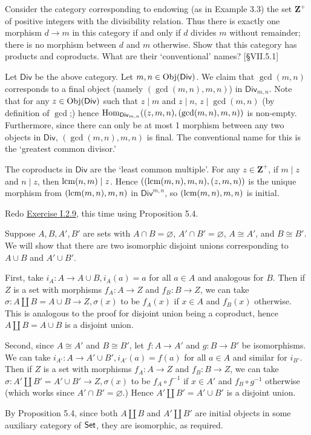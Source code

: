 \begin{problem}[5.6]
	Consider the category corresponding to endowing (as in Example 3.3) the set
	$\mathbf{Z}^+$ of positive integers with the divisibility relation. Thus there
	is exactly one morphism $d\to m$ in this category if and only if $d$ divides $m$
	without remainder; there is no morphism between $d$ and $m$ otherwise. Show that
	this category has products and coproducts. What are their `conventional' names?
	[\S VII.5.1]
\end{problem}
\begin{solution}
	Let $\mathsf{Div}$ be the above category. Let $m,n\in\mathrm{Obj}(\mathsf{Div})$. We claim that $\gcd(m,n)$ corresponds to a final object (namely $(\gcd(m,n),m,n)$) in $\mathsf{Div}_{m,n}$. Note that for any $z\in\mathrm{Obj}(\mathsf{Div})$ such that $z\mid m$ and $z\mid
	n$, $z\mid\gcd(m,n)$ (by definition of $\gcd$;) hence $\mathrm{Hom}_{\mathsf{Div}_{m,n}}((z,m,n),(\gcd(m,n),m,n))$ is non-empty. Furthermore, since there can only be at most 1 morphism between any two objects in $\mathsf{Div}$, $(\gcd(m,n),m,n)$ is final. The conventional name for this is the `greatest common divisor.'
	
	The coproducts in $\mathsf{Div}$ are the `least common multiple'. For any
	$z\in\mathbf{Z}^+$, if $m\mid z$ and $n\mid z$, then $\operatorname{lcm}(n,m)\mid z$. Hence $((\operatorname{lcm}(m,n),m,n),(z,m,n))$ is the unique morphism from $(\operatorname{lcm}(m,n),m,n)$ in $\mathsf{Div}^{m,n}$, so $(\operatorname{lcm}(m,n),m,n)$ is initial.
\end{solution}


\begin{problem}[5.7]
	Redo \hyperlink{Exercise I.2.9}{Exercise I.2.9}, this time using Proposition 5.4.
\end{problem}
\begin{solution}
	Suppose $A,B,A',B'$ are sets with $A\cap B=\varnothing$, $A'\cap B'=\varnothing$,
	$A\cong A'$, and $B\cong B'$. We will show that there are two isomorphic
	disjoint unions corresponding to $A\cup B$ and $A'\cup B'$.
	
	First, take $i_A:A\to A\cup B, i_A(a) = a$ for all $a\in A$ and analogous for
	$B$. Then if $Z$ is a set with morphisms $f_A:A\to Z$ and $f_B:B\to Z$, we can
	take $\sigma:A\amalg B=A\cup B\to Z, \sigma(x)$ to be $f_A(x)$ if $x\in A$ and
	$f_B(x)$ otherwise. This is analogous to the proof for disjoint union being a
	coproduct, hence $A\amalg B=A\cup B$ is a disjoint union.
	
	Second, since $A\cong A'$ and $B\cong B'$, let $f:A\to A'$ and $g:B\to B'$ be
	isomorphisms. We can take $i_{A'}: A\to A'\cup B',i_{A'}(a) = f(a)$ for all
	$a\in A$ and similar for $i_{B'}$. Then if $Z$ is a set with morphisms $f_A:A\to
	Z$ and $f_B:B\to Z$, we can take $\sigma:A'\amalg B'=A'\cup B'\to Z, \sigma(x)$
	to be $f_A\circ f^{-1}$ if $x\in A'$ and $f_B\circ g^{-1}$ otherwise (which
	works since $A'\cap B'=\varnothing$.) Hence $A'\amalg B'=A'\cup B'$ is a disjoint
	union.
	
	By Proposition 5.4, since both $A\amalg B$ and $A'\amalg B'$ are initial objects
	in some auxiliary category of $\mathsf{Set}$, they are isomorphic, as required.
\end{solution}


